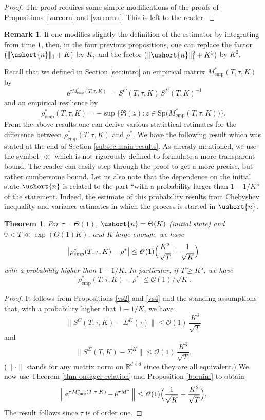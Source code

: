 \documentclass[10pt]{amsart}
\newcommand{\emp}{\mathrm{emp}}
\newcommand{\scaleto}[2]{#1}
\let\mathcal\mathscr
\numberwithin{equation}{section}
\theoremstyle{plain}
\newtheorem{theorem}{Theorem}[section]
\theoremstyle{definition}
\newtheorem{remark}{Remark}[section]
\newcommand{\Oun}{\mathcal{O}(1)}
\newcommand{\Thetaun}{\Theta(1)}
\newcommand{\sK}{K}
\newcommand{\Sp}{\mathrm{Sp}}
\newcommand{\vecn}{\ushort{n}}
\newcommand{\res}{\rho^*}
\newcommand{\e}{\operatorname{e}}
\newcommand{\norm}[1]{\|#1\|_{1}}\let\snorm\norm
\begin{document}
\begin{proof}
The proof requires some simple modifications of the proofs of Propositions~\ref{varcorn} and \ref{varcornu}. This is left to the reader.
\end{proof}

\begin{remark}
If one modifies slightly the definition of the estimator by integrating from time $1$,
then, in the four previous propositions, one can replace the factor \hbox{$(\norm{\vecn}+K)$} by $K$, and the factor
$(\norm{\vecn}^{2}+K^2)$ by $K^2$.
\end{remark}

Recall that we defined in Section \ref{sec:intro} an empirical matrix $M^{*}_\emp(T,\tau,K)$ by
\[
\e^{\tau M^{*}_\emp(T,\tau,K)}=S^{C}(T,\tau,K)\,S^{\Sigma}(T,K)^{-1}
\]
and an empirical resilience by
\[
\rho^*_\emp(T,\tau,K)=- \sup\{ \Re (z): z\in\Sp\bigl(M^{*}_\emp(T,\tau,K)\bigr)\}.
\]
From the above results one can derive various statistical estimates for the difference between $\rho^*_\emp(T,\tau,K)$
and $\res$. We have the following result which was stated at the end of Section \ref{subsec:main-results}. As already mentioned, we
use the symbol $\ll$ which is not rigorously defined to formulate a more transparent bound.
The reader can easily step through the proof to get a more precise, but rather cumbersome bound.
Let us also note that the dependence on the initial state $\vecn$ is related to the part ``with a probability larger than
$1-1/K$'' of the statement. Indeed, the estimate of this probability results from Chebyshev inequality and variance estimates in which the process is
started in $\vecn$.


\begin{theorem}\label{rhoemp}
For $\tau=\Theta(1)$, $\vecn=\Theta(K)$ (initial state) and $0<T\ll \exp(\Thetaun K)$,
and $K$ large enough, we have
\[
\big|\rho^*_\emp(T,\tau,K)-\res\big|\le
\Oun \Bigl(\frac{K^{2}}{\sqrt{T}} +\frac{1}{\sqrt{K}} \Bigr)
\]
with a probability higher than $1-1/K$.
In particular, if $T\geq K^{\scaleto{5}{4.5pt}} $, we have
\[
\big|\rho^*_\emp(T,\tau,K)-\res\big|\leq \Oun/\sqrt{K}.
\]
\end{theorem}


\begin{proof}
It follows from Propositions \ref{vs2} and \ref{vs4} and the standing assumptions that, with a probability higher that $1-1/K$, we have
\[
\|S^{C}(T,\tau,K)-\Sigma^{\sK}(\tau)\|\leq \Oun\, \frac{K^{\scaleto{3}{4pt}}}{\sqrt{T}}
\]
and
\[
\|S^{{ \Sigma}}(T,K)-\Sigma^{\sK}\|\leq \Oun \, \frac{K^{\scaleto{3}{4.5pt}}}{\sqrt{T}}.
\]
($\|\cdot\|$ stands for any matrix norm on $\mathds{R}^{d\times d}$ since they are all equivalent.)
We now use Theorem \ref{thm-onsager-relation} and Proposition \ref{borninf} to obtain
\[
\Big\| \e^{\tau M^{*}_\emp(T,\tau,K)}-\e^{\tau M^{*}}\Big\|\leq \Oun \Bigl(\frac{1}{\sqrt{K}}+ \frac{K^2}{\sqrt{T}} \Bigr).
\]
The result follows since $\tau$ is of order one.
\end{proof}
\end{document}

